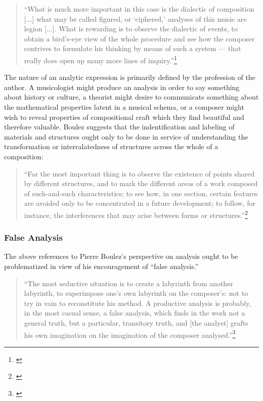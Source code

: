 \begin{quote}
\singlespacing
``What is much more important in this case is the dialectic of composition [...] what may be called figured, or `ciphered,' analyses of this music are legion [...]. What is rewarding is to observe the dialectic of events, to obtain a bird's-eye view of the whole procedure and see how the composer contrives to formulate his thinking by means of such a system — that really does open up many more lines of inquiry.''\footnote{\citet[116]{boulez}}
\end{quote}

The nature of an analytic expression is primarily defined by the profession of the author. A musicologist might produce an analysis in order to say something about history or culture, a theorist might desire to communicate something about the mathematical properties latent in a musical schema, or a composer might wish to reveal properties of compositional craft which they find beautiful and therefore valuable.  Boulez suggests that the indentification and labeling of materials and structures ought only to be done in service of understanding the transformation or interralatedness of structures across the whole of a composition:

\begin{quote}
\singlespacing
``Far the most important thing is to observe the existence of points shared 
 by different structures, and to mark the different areas of a work composed of such-and-such characteristics; to see how, in one section, certain features are avoided only to be concentrated in a future development; to follow, for instance, the interferences that may arise between forms or structures.''\footnote{\citet[117]{boulez}}
\end{quote}

\subsubsection{False Analysis}

The above references to Pierre Boulez's perspective on analysis ought to be problematized in view of his encouragement of ``false analysis.''

\begin{quote}
    \singlespacing
    ``The most seductive situation is to create a labyrinth from another labyrinth, to superimpose one's own labyrinth on the composer's: not to try in vain to reconstitute his method. A productive analysis is probably, in the most casual sense, a false analysis, which finds in the work not a general truth, but a particular, transitory truth, and [the analyst] grafts his own imagination on the imagination of the composer analysed.''\footnote{\citet[88]{boulez-language}}
\end{quote}


